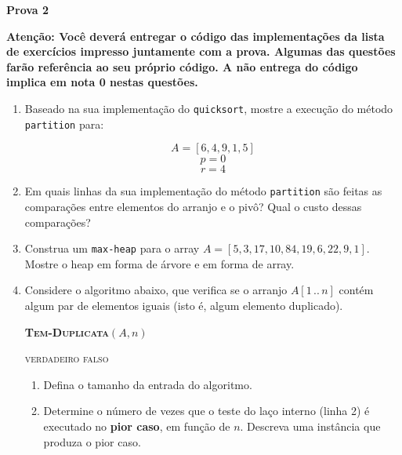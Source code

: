 \documentclass[9pt,a4paper]{extarticle}
\begin{document}
\begin{center}
  \Large \textbf{Prova 2} \\[4pt]
\end{center}

\vspace{-0.0cm}

\textbf{Atenção: Você deverá entregar o código das implementações da lista de exercícios impresso juntamente com a prova. Algumas das questões farão referência ao seu próprio código. A não entrega do código implica em nota 0 nestas questões.}

\begin{enumerate}
  \item Baseado na sua implementação do \texttt{quicksort}, mostre a execução do método \texttt{partition} para:

  \[A = [6,4,9,1,5]\]
  \[p = 0\]
  \[r = 4\]

  \item Em quais linhas da sua implementação do método \texttt{partition} são feitas as comparações entre elementos do arranjo e o pivô? Qual o custo dessas comparações?

  \item Construa um \texttt{max-heap} para o array $A = [5,3,17,10,84,19,6,22,9,1]$. Mostre o heap em forma de árvore e em forma de array.

  \item Considere o algoritmo abaixo, que verifica se o arranjo $A[1\,..\,n]$ contém algum par de elementos iguais (isto é, algum elemento duplicado).

    \begin{center}
    \begin{minipage}{0.65\textwidth}
    \textbf{\textsc{Tem-Duplicata}}$(A, n)$
    \begin{algorithmic}[1]
                    \State \Return \textsc{verdadeiro}
                \EndIf
            \EndFor
        \EndFor
        \State \Return \textsc{falso}
    \end{algorithmic}
    \end{minipage}
    \end{center}

\begin{enumerate}[label=(\alph*)]
    \item Defina o tamanho da entrada do algoritmo.
    \item Determine o número de vezes que o teste do laço interno (linha 2) é executado no \textbf{pior caso}, em função de $n$. Descreva uma instância que produza o pior caso.


\end{enumerate}
\end{enumerate}
\end{document}
